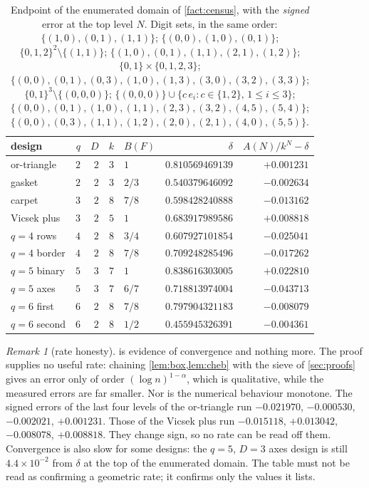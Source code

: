 \documentclass[11pt]{amsart}
\theoremstyle{definition}
\theoremstyle{remark}
\newtheorem{remark}[theorem]{Remark}
\begin{document}
\begin{table}[ht]
\centering
\small
\begin{tabular}{lrrrlrr}
\toprule
design & $q$ & $D$ & $k$ & $B(F)$ & $\delta$ & $A(N)/k^{N}-\delta$ \\
\midrule
or-triangle & $2$ & $2$ & $3$ & $1$   & $0.810569469139$ & $+0.001231$ \\
gasket      & $2$ & $2$ & $3$ & $2/3$ & $0.540379646092$ & $-0.002634$ \\
carpet      & $3$ & $2$ & $8$ & $7/8$ & $0.598428240888$ & $-0.013162$ \\
Vicsek plus & $3$ & $2$ & $5$ & $1$   & $0.683917989586$ & $+0.008818$ \\
$q=4$ rows  & $4$ & $2$ & $8$ & $3/4$ & $0.607927101854$ & $-0.025041$ \\
$q=4$ border& $4$ & $2$ & $8$ & $7/8$ & $0.709248285496$ & $-0.017262$ \\
$q=5$ binary& $5$ & $3$ & $7$ & $1$   & $0.838616303005$ & $+0.022810$ \\
$q=5$ axes  & $5$ & $3$ & $7$ & $6/7$ & $0.718813974004$ & $-0.043713$ \\
$q=6$ first & $6$ & $2$ & $8$ & $7/8$ & $0.797904321183$ & $-0.008079$ \\
$q=6$ second& $6$ & $2$ & $8$ & $1/2$ & $0.455945326391$ & $-0.004361$ \\
\bottomrule
\end{tabular}
\caption{Endpoint of the enumerated domain of \cref{fact:census}, with the \emph{signed} error at the top level $N$. Digit sets, in the same order: $\{(1,0),(0,1),(1,1)\}$; $\{(0,0),(1,0),(0,1)\}$; $\{0,1,2\}^2 \setminus \{(1,1)\}$; $\{(1,0),(0,1),(1,1),(2,1),(1,2)\}$; $\{0,1\}\times\{0,1,2,3\}$; $\{(0,0),(0,1),(0,3),(1,0),(1,3),(3,0),(3,2),(3,3)\}$; $\{0,1\}^3\setminus\{(0,0,0)\}$; $\{(0,0,0)\} \cup \{c\,e_i : c \in \{1,2\},\, 1 \le i \le 3\}$; $\{(0,0),(0,1),(1,0),(1,1),(2,3),(3,2),(4,5),(5,4)\}$; $\{(0,0),(0,3),(1,1),(1,2),(2,0),(2,1),(4,0),(5,5)\}$.}
\label{tab:endpoints}
\end{table}

\begin{remark}[rate honesty]
\label{rem:rate}
 is evidence of convergence and nothing more. The proof supplies no useful rate: chaining \cref{lem:box,lem:cheb} with the sieve of \cref{sec:proofs} gives an error only of order $(\log n)^{1-\alpha}$, which is qualitative, while the measured errors are far smaller. Nor is the numerical behaviour monotone. The signed errors of the last four levels of the or-triangle run $-0.021970$, $-0.000530$, $-0.002021$, $+0.001231$. Those of the Vicsek plus run $-0.015118$, $+0.013042$, $-0.008078$, $+0.008818$. They change sign, so no rate can be read off them. Convergence is also slow for some designs: the $q=5$, $D=3$ axes design is still $4.4 \times 10^{-2}$ from $\delta$ at the top of the enumerated domain. The table must not be read as confirming a geometric rate; it confirms only the values it lists.
\end{remark}
\end{document}
